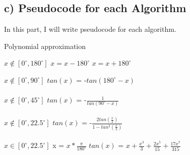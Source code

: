 \documentclass[letterpaper, 11pt]{report}
\begin{document}
\subsection*{c) Pseudocode for each Algorithm}
In this part, I will write pseudocode for each algorithm.\\
\begin{algorithm}
\caption{\cite{pseupoly}Polynomial approximation} \label{alg:cap}
\begin{algorithmic}
\Require $x \notin [0^\circ,180^\circ]$ 
\State $x = x-180^\circ$
\EndWhile 
\Else
\State $x = x+180^\circ$
\EndWhile 
\EndIf\\   
\EndFunction
\end{algorithmic}
\end{algorithm}
\begin{algorithm}
\begin{algorithmic}
\Require $x \notin [0^\circ,90^\circ]$ 
\State $tan(x)$ = -$tan(180^\circ-x)$\\
\EndFunction\\
\newline
\Require $x \notin [0^\circ,45^\circ]$ 
\State $tan(x)$ = -$\frac{1}{tan(90^\circ-x)}$\\
\EndFunction\\
\newline
\Require $x \notin [0^\circ,22.5^\circ]$ 
\State $tan(x)$ = -$\frac{2tan(\frac{x}{2})}{1-tan^2(\frac{x}{2})}$\\
\EndFunction\\
\newline
\Require $x \in [0^\circ,22.5^\circ]$ 
\State x = $x * \frac{\pi}{180^\circ}$
\State $tan(x)$ = $x+\frac{x^3}{3} + \frac{2x^5}{15} +\frac{17x^7}{315}$\\
\EndFunction\\
\end{algorithmic}
\end{algorithm}
\end{document}
